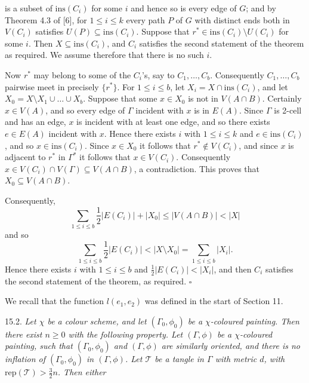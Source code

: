 \noindent is a subset of $\text{ins}(C_i)$ for some $i$ and hence so is every edge of $G$; and by Theorem 4.3 of [6], for $1 \le i \le k$ every path $P$ of $G$ with distinct ends both in $V(C_i)$ satisfies $U(P) \subseteq \text{ins}(C_i)$. Suppose that $r^* \in \text{ins}(C_i) \setminus U(C_i)$ for some $i$. Then $X \subseteq \text{ins}(C_i)$, and $C_i$ satisfies the second statement of the theorem as required. We assume therefore that there is no such $i$.

Now $r^*$ may belong to some of the $C_i$'s, say to $C_1, \dots, C_b$. Consequently $C_1, \dots, C_b$ pairwise meet in precisely $\{r^*\}$. For $1 \le i \le b$, let $X_i = X \cap \text{ins}(C_i)$, and let $X_0 = X \setminus X_1 \cup \dots \cup X_b$. Suppose that some $x \in X_0$ is not in $V(A \cap B)$. Certainly $x \in V(A)$, and so every edge of $\Gamma$ incident with $x$ is in $E(A)$. Since $\Gamma$ is 2-cell and has an edge, $x$ is incident with at least one edge, and so there exists $e \in E(A)$ incident with $x$. Hence there exists $i$ with $1 \le i \le k$ and $e \in \text{ins}(C_i)$, and so $x \in \text{ins}(C_i)$. Since $x \in X_0$ it follows that $r^* \notin V(C_i)$, and since $x$ is adjacent to $r^*$ in $\Gamma^*$ it follows that $x \in V(C_i)$. Consequently $x \in V(C_i) \cap V(\Gamma) \subseteq V(A \cap B)$, a contradiction. This proves that $X_0 \subseteq V(A \cap B)$.

Consequently,
\begin{equation*}
\sum_{1 \le i \le b} \frac{1}{2}|E(C_i)| + |X_0| \le |V(A \cap B)| < |X|
\end{equation*}
and so
\begin{equation*}
\sum_{1 \le i \le b} \frac{1}{2}|E(C_i)| < |X \setminus X_0| = \sum_{1 \le i \le b} |X_i|.
\end{equation*}
Hence there exists $i$ with $1 \le i \le b$ and $\frac{1}{2}|E(C_i)| < |X_i|$, and then $C_i$ satisfies the second statement of the theorem, as required. $\square$

We recall that the function $l(e_1, e_2)$ was defined in the start of Section 11.

15.2. \textit{Let $\chi$ be a colour scheme, and let $(\Gamma_0, \phi_0)$ be a $\chi$-coloured painting. Then there exist $n \ge 0$ with the following property. Let $(\Gamma, \phi)$ be a $\chi$-coloured painting, such that $(\Gamma_0, \phi_0)$ and $(\Gamma, \phi)$ are similarly oriented, and there is no inflation of $(\Gamma_0, \phi_0)$ in $(\Gamma, \phi)$. Let $\mathscr{T}$ be a tangle in $\Gamma$ with metric $d$, with $\text{rep}(\mathscr{T}) > \frac{3}{2}n$. Then either}

